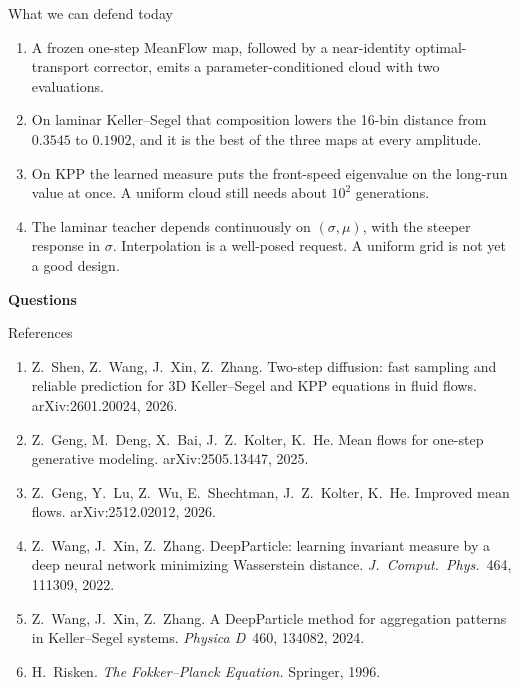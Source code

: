 \documentclass[aspectratio=169,11pt,t]{beamer}
\begin{document}
\begin{frame}{What we can defend today}
  \begin{enumerate}
    \item A frozen one-step MeanFlow map, followed by a near-identity optimal-transport corrector, emits a parameter-conditioned cloud with two evaluations.
    \item On laminar Keller--Segel that composition lowers the 16-bin distance from $0.3545$ to $0.1902$, and it is the best of the three maps at every amplitude.
    \item On KPP the learned measure puts the front-speed eigenvalue on the long-run value at once. A uniform cloud still needs about \(10^2\) generations.
    \item The laminar teacher depends continuously on $(\sigma,\mu)$, with the steeper response in $\sigma$. Interpolation is a well-posed request. A uniform grid is not yet a good design.
  \end{enumerate}
  \vspace{0.55em}
  \begin{center}
    {\color{HKUGreen}\large\bfseries Questions}
  \end{center}
\end{frame}

\begin{frame}{References}
  \small
  \begin{enumerate}
    \item Z.~Shen, Z.~Wang, J.~Xin, Z.~Zhang.
          Two-step diffusion: fast sampling and reliable prediction for 3D Keller--Segel and KPP equations in fluid flows.
          arXiv:2601.20024, 2026.
    \item Z.~Geng, M.~Deng, X.~Bai, J.~Z.~Kolter, K.~He.
          Mean flows for one-step generative modeling.
          arXiv:2505.13447, 2025.
    \item Z.~Geng, Y.~Lu, Z.~Wu, E.~Shechtman, J.~Z.~Kolter, K.~He.
          Improved mean flows.
          arXiv:2512.02012, 2026.
    \item Z.~Wang, J.~Xin, Z.~Zhang.
          DeepParticle: learning invariant measure by a deep neural network minimizing Wasserstein distance.
          \emph{J.\ Comput.\ Phys.}~464, 111309, 2022.
    \item Z.~Wang, J.~Xin, Z.~Zhang.
          A DeepParticle method for aggregation patterns in Keller--Segel systems.
          \emph{Physica D}~460, 134082, 2024.
    \item H.~Risken.
          \emph{The Fokker--Planck Equation.}
          Springer, 1996.
  \end{enumerate}
\end{frame}
\end{document}
